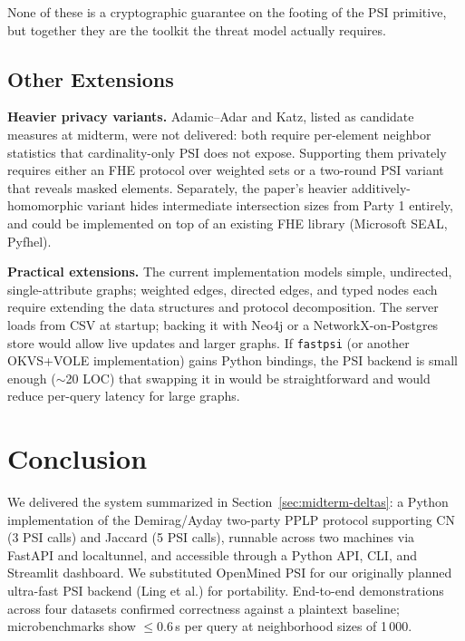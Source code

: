 \documentclass[sigconf]{acmart}
\begin{document}
None of these is a cryptographic guarantee on the footing of the PSI primitive, but together they are the toolkit the threat model actually requires.

\subsection{Other Extensions}
\textbf{Heavier privacy variants.} Adamic--Adar and Katz, listed as candidate measures at midterm, were not delivered: both require per-element neighbor statistics that cardinality-only PSI does not expose. Supporting them privately requires either an FHE protocol over weighted sets or a two-round PSI variant that reveals masked elements. Separately, the paper's heavier additively-homomorphic variant hides intermediate intersection sizes from Party 1 entirely, and could be implemented on top of an existing FHE library (Microsoft SEAL, Pyfhel).

\textbf{Practical extensions.} The current implementation models simple, undirected, single-attribute graphs; weighted edges, directed edges, and typed nodes each require extending the data structures and protocol decomposition. The server loads from CSV at startup; backing it with Neo4j or a NetworkX-on-Postgres store would allow live updates and larger graphs. If \texttt{fastpsi} (or another OKVS+VOLE implementation) gains Python bindings, the PSI backend is small enough ($\sim$20 LOC) that swapping it in would be straightforward and would reduce per-query latency for large graphs.

\section{Conclusion}

We delivered the system summarized in Section~\ref{sec:midterm-deltas}: a Python implementation of the Demirag/Ayday two-party PPLP protocol supporting CN (3 PSI calls) and Jaccard (5 PSI calls), runnable across two machines via FastAPI and localtunnel, and accessible through a Python API, CLI, and Streamlit dashboard. We substituted OpenMined PSI for our originally planned ultra-fast PSI backend (Ling et al.) for portability. End-to-end demonstrations across four datasets confirmed correctness against a plaintext baseline; microbenchmarks show $\le 0.6$\,s per query at neighborhood sizes of 1\,000.
\end{document}
